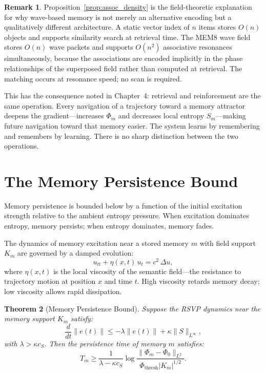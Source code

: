 \documentclass[12pt, oneside]{book}
\theoremstyle{flyxion}
\newtheorem{theorem}{Theorem}[chapter]
\theoremstyle{definition}
\newtheorem{remark}[theorem]{Remark}
\begin{document}
\begin{remark}
Proposition~\ref{prop:assoc_density} is the
field-theoretic explanation for why wave-based
memory is not merely an alternative encoding but
a qualitatively different architecture. A static
vector index of $n$ items stores $O(n)$ objects
and supports similarity search at retrieval time.
The MEM\textbar{}8 wave field stores $O(n)$ wave
packets and supports $O(n^2)$ associative
resonances simultaneously, because the associations
are encoded implicitly in the phase relationships
of the superposed field rather than computed at
retrieval. The matching occurs at resonance speed;
no scan is required.
\end{remark}

This has the consequence noted in Chapter~4: retrieval
and reinforcement are the same operation. Every
navigation of a trajectory toward a memory attractor
deepens the gradient---increases $\Phi_m$ and
decreases local entropy $S_m$---making future navigation
toward that memory easier. The system learns by
remembering and remembers by learning. There is no
sharp distinction between the two operations.

\section{The Memory Persistence Bound}

Memory persistence is bounded below by a function of
the initial excitation strength relative to the ambient
entropy pressure. When excitation dominates entropy,
memory persists; when entropy dominates, memory fades.

The dynamics of memory excitation near a stored
memory $m$ with field support $K_m$ are governed
by a damped evolution:
\[
u_{tt} + \eta(x,t)\,u_t = c^2\,\Delta u,
\]
where $\eta(x,t)$ is the local viscosity of the
semantic field---the resistance to trajectory motion
at position $x$ and time $t$. High viscosity retards
memory decay; low viscosity allows rapid dissipation.

\begin{theorem}[Memory Persistence Bound]
\label{thm:persistence}
Suppose the RSVP dynamics near the memory support
$K_m$ satisfy:
\[
\frac{d}{dt}\|e(t)\| \leq -\lambda\|e(t)\| +
\kappa\|S\|_{L^\infty},
\]
with $\lambda > \kappa c_S$. Then the persistence
time of memory $m$ satisfies:
\[
T_m \geq \frac{1}{\lambda - \kappa c_S}
\log\frac{\|\Phi_m - \Phi_0\|_{L^2}}{\Phi_\mathrm{thresh}
|K_m|^{1/2}}.
\]
\end{theorem}
\end{document}
